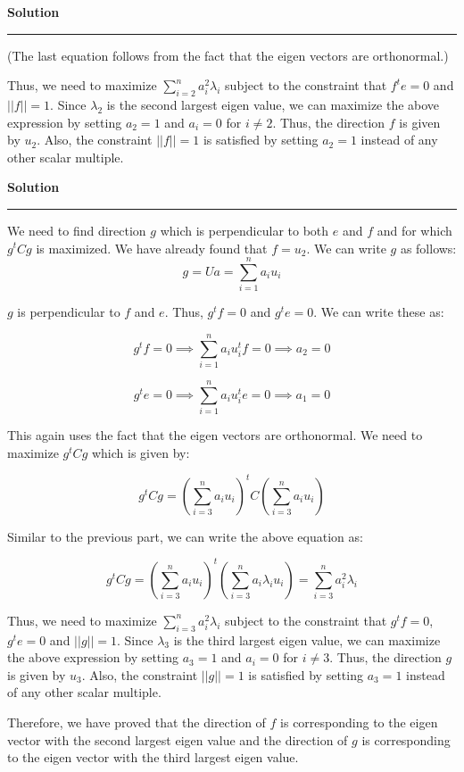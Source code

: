 \documentclass[a4paper,12pt]{article}
\newenvironment{solution}[2][]{%
    \begin{mdframed}[linecolor=blue!70!black, linewidth=2pt, roundcorner=10pt, backgroundcolor=yellow!10!white, skipabove=12pt, skipbelow=12pt]%
        \textbf{\large #2}
        \par\noindent\rule{\textwidth}{0.4pt}
}{
    \end{mdframed}
}
\begin{document}
\begin{solution}{Solution}
(The last equation follows from the fact that the eigen vectors are orthonormal.)

Thus, we need to maximize $\sum_{i=2}^n a_{i}^{2}\lambda_{i}$ subject to the constraint that $f^{t}e = 0$ and $||f|| = 1$. Since $\lambda_2$ is the second largest eigen value, we can maximize the above expression by setting $a_2 = 1$ and $a_i = 0$ for $i \neq 2$. Thus, the direction $f$ is given by $u_2$. Also, the constraint $||f|| = 1$ is satisfied by setting $a_2 = 1$ instead of any other scalar multiple.
\end{solution}
\clearpage
\begin{solution}{Solution}
  We need to find direction $g$ which is perpendicular to both $e$ and $f$ and for which $g^{t}Cg$ is maximized. We have already found that $f = u_{2}$. We can write $g$ as follows:
  \begin{equation}
    g = Ua = \sum_{i=1}^{n} a_{i}u_{i}
  \end{equation}

$g$ is perpendicular to $f$ and $e$. Thus, $g^{t}f = 0$ and $g^{t}e = 0$. We can write these as:

\begin{equation}
  g^{t}f = 0 \implies \sum_{i=1}^{n} a_{i}u_{i}^{t}f = 0 \implies a_2 = 0
\end{equation}

\begin{equation}
  g^{t}e = 0 \implies \sum_{i=1}^{n} a_{i}u_{i}^{t}e = 0 \implies a_1 = 0
\end{equation}

This again uses the fact that the eigen vectors are orthonormal. We need to maximize $g^{t}Cg$ which is given by:

\begin{equation}
  g^{t}Cg = {\left(\sum_{i=3}^n a_{i}u_{i}\right)}^t C\left(\sum_{i=3}^n a_{i}u_{i}\right)
\end{equation}

Similar to the previous part, we can write the above equation as:

\begin{equation}
  g^{t}Cg = {\left(\sum_{i=3}^n a_{i}u_{i}\right)}^t \left(\sum_{i=3}^n a_i\lambda_{i}u_{i}\right) = \sum_{i=3}^n a_{i}^{2}\lambda_{i}
\end{equation}

Thus, we need to maximize $\sum_{i=3}^n a_i^2\lambda_i$ subject to the constraint that $g^{t}f = 0$, $g^{t}e = 0$ and $||g|| = 1$. Since $\lambda_3$ is the third largest eigen value, we can maximize the above expression by setting $a_3 = 1$ and $a_i = 0$ for $i \neq 3$. Thus, the direction $g$ is given by $u_3$. Also, the constraint $||g|| = 1$ is satisfied by setting $a_3 = 1$ instead of any other scalar multiple.


Therefore, we have proved that the direction of $f$ is corresponding to the eigen vector with the second largest eigen value and the direction of $g$ is corresponding to the eigen vector with the third largest eigen value.
\end{solution}
\end{document}
